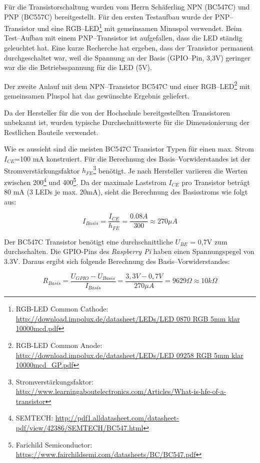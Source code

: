 \documentclass[11pt,ngerman,toc=listof,index=totoc]{scrreprt}
\begin{document}
Für die Transistorschaltung wurden vom Herrn Schäferling NPN (BC547C)
und PNP (BC557C) bereitgestellt. Für den ersten Testaufbau wurde der
PNP--Transistor und eine RGB--LED\footnote{RGB-LED Common Cathode:
  \url{http://download.impolux.de/datasheet/LEDs/LED 0870 RGB 5mm klar 10000mcd.pdf}}
mit gemeinsamen Minuspol verwendet. Beim Test--Aufbau mit einem
PNP--Transistor ist aufgefallen, dass die LED ständig geleuchtet hat.
Eine kurze Recherche hat ergeben, dass der Transistor permanent
durchgeschaltet war, weil die Spannung an der Basis (GPIO--Pin, 3,3V)
geringer war die die Betriebsspannung für die LED (5V).

Der zweite Anlauf mit dem NPN--Transistor BC547C und einer
RGB--LED\footnote{RGB-LED Common Anode:
  \url{http://download.impolux.de/datasheet/LEDs/LED 09258 RGB 5mm klar 10000mcd_GP.pdf}}
mit gemeinsamen Pluspol hat das gewünschte Ergebnis geliefert.

Da der Hersteller für die von der Hochschule bereitgestellten
Transistoren unbekannt ist, wurden typische Durchschnittswerte für die
Dimensionierung der Restlichen Bauteile verwendet.

Wie es aussieht sind die meisten BC547C Transistor Typen für einen max.
Strom \(I_{CE}\)=100 mA konstruiert. Für die Berechnung des
Basis--Vorwiderstandes ist der Stromverstärkungsfaktor
\(h_{FE}\)\footnote{Stromverstärkungsfaktor:
  \url{http://www.learningaboutelectronics.com/Articles/What-is-hfe-of-a-transistor}}
benötigt. Je nach Hersteller variieren die Werten zwischen 200\footnote{SEMTECH:
  \url{http://pdf1.alldatasheet.com/datasheet-pdf/view/42386/SEMTECH/BC547.html}}
und 400\footnote{Farichild Semiconductor:
  \url{https://www.fairchildsemi.com/datasheets/BC/BC547.pdf}}. Da der
maximale Laststrom \(I_{CE}\) pro Transistor beträgt 80 mA (3 LEDs je
max. 20mA), sieht die Berechnung des Basisstroms wie folgt aus:

\[I_{Basis} = \frac{I_{CE}}{h_{FE}} = \frac{0.08A}{300} \approx 270\mu A\]

Der BC547C Transistor benötigt eine durchschnittliche \(U_{BE}\) = 0,7V
zum durchschalten. Die GPIO-Pins des \emph{Raspberry Pi} haben einen
Spannungspegel von 3.3V. Daraus ergibt sich folgende Berechnung des
Basis--Vorwiderstandes:

\[R_{Basis} = \frac{U_{GPIO} - U_{Basis}}{I_{Basis}} = \frac{3,3V - 0,7V}{270\mu A} = 9629 \Omega \approx 10k \Omega \]
\end{document}
